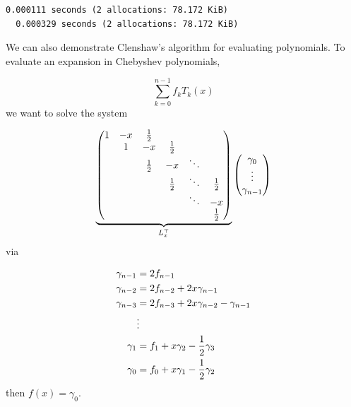 \documentclass[12pt,a4paper]{article}
\begin{document}
\begin{lstlisting}
0.000111 seconds (2 allocations: 78.172 KiB)
  0.000329 seconds (2 allocations: 78.172 KiB)
\end{lstlisting}


We can also demonstrate Clenshaw's algorithm for evaluating polynomials. To evaluate an expansion in Chebyshev polynomials,

\[
\sum_{k = 0}^{n-1}f_kT_k(x)
\]
we want to solve the system

\[
\underbrace{\begin{pmatrix}
1 & -x & {1\over 2} \\
& 1 & -x & {1\over 2}  \\
& & {1\over 2} & -x & \ddots  \\
& &     & {1\over 2} & \ddots & {1\over 2} \\
&&&&\ddots & -x \\
&&&&& {1\over 2}
\end{pmatrix}}_{L_x^\top} \begin{pmatrix} \gamma_0 \\\vdots\\ \gamma_{n-1} \end{pmatrix}
\]
via


\begin{align*}
\gamma_{n-1} &= 2f_{n-1} \\
\gamma_{n-2} &= 2f_{n-2} + 2x \gamma_{n-1} \\
\gamma_{n-3} &= 2 f_{n-3} + 2x \gamma_{n-2} - \gamma_{n-1} \\
& \vdots \\
\gamma_1 &= f_1 + x \gamma_2 - {1\over 2} \gamma_3 \\
\gamma_0 &= f_0 + x \gamma_1 - {1\over 2} \gamma_2
\end{align*}
then $f(x) = \gamma_0$.
\end{document}
